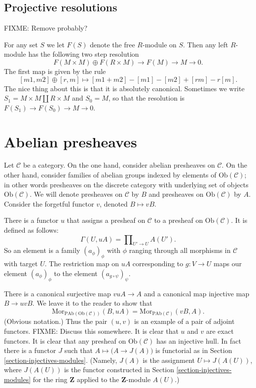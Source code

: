 \subsection{Projective resolutions}
\label{subsection-projective-resolution}

\noindent
FIXME: Remove probably?

\noindent
For any set $S$ we let $F(S)$ denote the free $R$-module on $S$.
Then any left $R$-module has the following two step resolution
$$
F(M\times M) \oplus F(R\times M) \to F(M) \to M \to 0.
$$
The first map is given by the rule
$$
[m1,m2] \oplus [r,m] \mapsto [m1+m2]-[m1]-[m2]+[rm]-r[m].
$$
The nice thing about this is that it is absolutely canonical.
Sometimes we write $S_1 = M\times M \coprod R\times M$ and
$S_0=M$, so that the resolution is $F(S_1) \to F(S_0) \to M \to 0$.

\section{Abelian presheaves}
\label{section-injectives-presheaves}

\noindent
Let $\mathcal{C}$ be a category. On the one hand, consider abelian
presheaves on $\mathcal{C}$. On the other hand, consider
families of abelian groups indexed by elements of
$\text{Ob}(\mathcal{C})$; in other words presheaves on the discrete
category with underlying set of objects $\text{Ob}(\mathcal{C})$.
We will denote presheaves on $\mathcal{C}$ by $B$ and presheaves on
$\text{Ob}(\mathcal{C})$ by $A$. Consider the forgetful functor $v$,
denoted $B \mapsto vB$.

\smallskip\noindent
There is a functor $u$ that assigns a presheaf on $\mathcal{C}$
to a presheaf on $\text{Ob}(\mathcal{C})$. It is defined as follows:
$$
\Gamma(U, uA) = \prod\nolimits_{U' \to U} A(U').
$$
So an element is a family $(a_\phi)_\phi$ with $\phi$
ranging through all morphisms in $\mathcal{C}$ with target $U$.
The restriction map on $uA$ corresponding to $g : V \to U$
maps our element $(a_\phi)_\phi$ to the element 
$(a_{g \circ \psi})_\psi$. 

\smallskip\noindent
There is a canonical surjective map $vuA \to A$ and a canonical map
injective map $B \to uvB$. We leave it to the reader to show that
$$
\text{Mor}_{\text{PAb}(\text{Ob}(\mathcal{C}))}(B, uA) =
\text{Mor}_{\text{PAb}(\mathcal{C})}(vB, A).
$$
(Obvious notation.) Thus the pair $(u,v)$ is an example of a pair of adjoint
functors. FIXME: Discuss this somewhere. It is clear that $u$ and $v$ are exact functors. It is clear that any presheaf on $\text{Ob}(\mathcal{C})$ has an
injective hull. In fact there is a functor $J$ such that
$A \mapsto \big(A \to J(A)\big)$ is functorial as in
Section \ref{section-injectives-modules}.
(Namely, $J(A)$ is the assignment $U\mapsto J(A(U))$, where
$J(A(U))$ is the functor constructed in
Section \ref{section-injectives-modules} for the ring $\mathbf{Z}$
applied to the $\mathbf{Z}$-module $A(U)$.)

